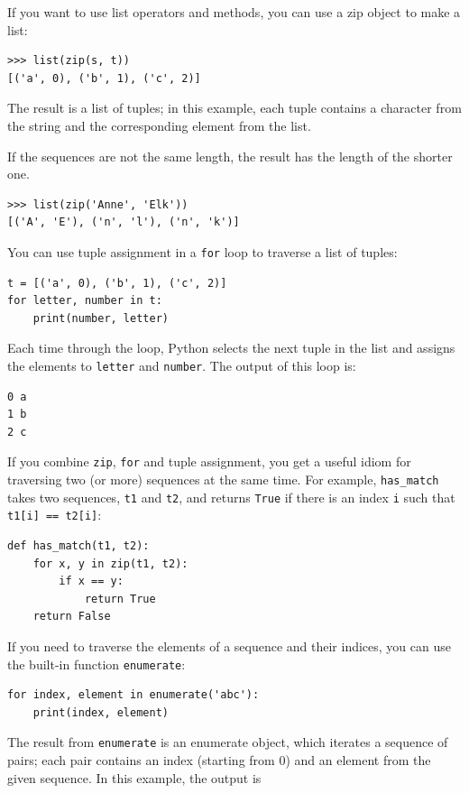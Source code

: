 \documentclass[10pt]{book}
\begin{document}
If you want to use list operators and methods, you can
use a zip object to make a list:

\begin{verbatim}
>>> list(zip(s, t))
[('a', 0), ('b', 1), ('c', 2)]
\end{verbatim}
%
The result is a list of tuples; in this example, each tuple contains
a character from the string and the corresponding element from
the list.

If the sequences are not the same length, the result has the
length of the shorter one.

\begin{verbatim}
>>> list(zip('Anne', 'Elk'))
[('A', 'E'), ('n', 'l'), ('n', 'k')]
\end{verbatim}
%
You can use tuple assignment in a {\tt for} loop to traverse a list of
tuples:

\begin{verbatim}
t = [('a', 0), ('b', 1), ('c', 2)]
for letter, number in t:
    print(number, letter)
\end{verbatim}
%
Each time through the loop, Python selects the next tuple in
the list and assigns the elements to {\tt letter} and
{\tt number}.  The output of this loop is:

\begin{verbatim}
0 a
1 b
2 c
\end{verbatim}
%
If you combine {\tt zip}, {\tt for} and tuple assignment, you get a
useful idiom for traversing two (or more) sequences at the same
time.  For example, \verb"has_match" takes two sequences, {\tt t1} and
{\tt t2}, and returns {\tt True} if there is an index {\tt i}
such that {\tt t1[i] == t2[i]}:

\begin{verbatim}
def has_match(t1, t2):
    for x, y in zip(t1, t2):
        if x == y:
            return True
    return False
\end{verbatim}
%
If you need to traverse the elements of a sequence and their
indices, you can use the built-in function {\tt enumerate}:

\begin{verbatim}
for index, element in enumerate('abc'):
    print(index, element)
\end{verbatim}
%
The result from {\tt enumerate} is an enumerate object, which
iterates a sequence of pairs; each pair contains an index (starting
from 0) and an element from the given sequence.
In this example, the output is
\end{document}
